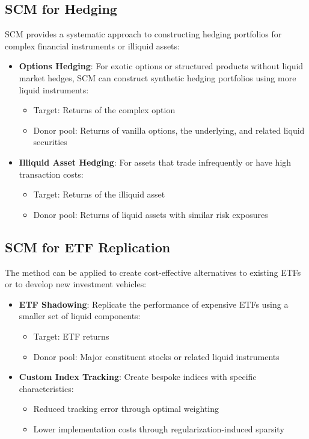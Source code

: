 \subsection{SCM for Hedging}
SCM provides a systematic approach to constructing hedging portfolios for complex financial instruments or illiquid assets:

\begin{itemize}
    \item \textbf{Options Hedging}: For exotic options or structured products without liquid market hedges, SCM can construct synthetic hedging portfolios using more liquid instruments:
    \begin{itemize}
        \item Target: Returns of the complex option
        \item Donor pool: Returns of vanilla options, the underlying, and related liquid securities
    \end{itemize}
    
    \item \textbf{Illiquid Asset Hedging}: For assets that trade infrequently or have high transaction costs:
    \begin{itemize}
        \item Target: Returns of the illiquid asset
        \item Donor pool: Returns of liquid assets with similar risk exposures
    \end{itemize}
\end{itemize}

\subsection{SCM for ETF Replication}
The method can be applied to create cost-effective alternatives to existing ETFs or to develop new investment vehicles:

\begin{itemize}
    \item \textbf{ETF Shadowing}: Replicate the performance of expensive ETFs using a smaller set of liquid components:
    \begin{itemize}
        \item Target: ETF returns
        \item Donor pool: Major constituent stocks or related liquid instruments
    \end{itemize}
    
    \item \textbf{Custom Index Tracking}: Create bespoke indices with specific characteristics:
    \begin{itemize}
        \item Reduced tracking error through optimal weighting
        \item Lower implementation costs through regularization-induced sparsity
    \end{itemize}
\end{itemize}

